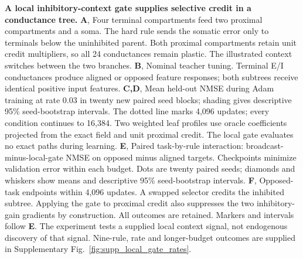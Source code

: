 \caption{\textbf{A local inhibitory-context gate supplies selective credit in a conductance tree.}
\textbf{A}, Four terminal compartments feed two proximal compartments and a soma. The hard rule sends the somatic error only to terminals below the uninhibited parent. Both proximal compartments retain unit credit multipliers, so all 24 conductances remain plastic. The illustrated context switches between the two branches.
\textbf{B}, Nominal teacher tuning. Terminal E/I conductances produce aligned or opposed feature responses; both subtrees receive identical positive input features.
\textbf{C,D}, Mean held-out NMSE during Adam training at rate 0.03 in twenty new paired seed blocks; shading gives descriptive 95\% seed-bootstrap intervals. The dotted line marks 4,096 updates; every condition continues to 16,384. Two weighted leaf profiles use oracle coefficients projected from the exact field and unit proximal credit. The local gate evaluates no exact paths during learning.
\textbf{E}, Paired task-by-rule interaction: broadcast-minus-local-gate NMSE on opposed minus aligned targets. Checkpoints minimize validation error within each budget. Dots are twenty paired seeds; diamonds and whiskers show means and descriptive 95\% seed-bootstrap intervals.
\textbf{F}, Opposed-task endpoints within 4,096 updates. A swapped selector credits the inhibited subtree. Applying the gate to proximal credit also suppresses the two inhibitory-gain gradients by construction. All outcomes are retained. Markers and intervals follow \textbf{E}. The experiment tests a supplied local context signal, not endogenous discovery of that signal. Nine-rule, rate and longer-budget outcomes are supplied in Supplementary Fig.~\ref{fig:supp_local_gate_rates}.}
